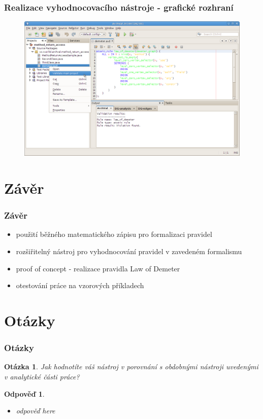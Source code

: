 \documentclass{beamer}
\newtheorem*{question}{Otázka}
\newtheorem*{response}{Odpověď}
\begin{document}
\begin{frame}
  \frametitle{Realizace vyhodnocovacího nástroje - grafické rozhraní}
    \begin{figure}[h!]
      \centering
      \includegraphics[width=1.0\textwidth]{./figures/archval.png}
    \end{figure}
\end{frame}

\section{Závěr}
\begin{frame}
  \frametitle{Závěr}
  \begin{itemize}
  \item použití běžného matematického zápisu pro formalizaci pravidel
  \item rozšiřitelný nástroj pro vyhodnocování pravidel v zavedeném formalismu
  \item proof of concept - realizace pravidla Law of Demeter
  \item otestování práce na vzorových příkladech
  \end{itemize}
\end{frame}

\section{Otázky}
\begin{frame}
  \frametitle{Otázky}
  \begin{question}
    Jak hodnotíte váš nástroj v porovnání s obdobnými nástroji uvedenými v analytické části práce?
  \end{question}
  \begin{response}
    \begin{itemize}
    \item odpověď here
    \end{itemize}
  \end{response}
\end{frame}
\end{document}
